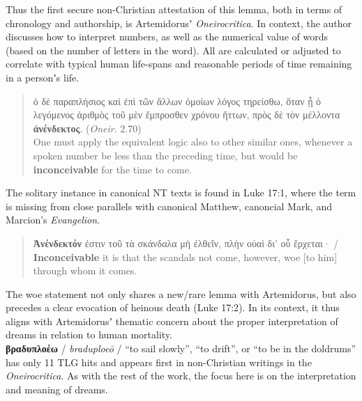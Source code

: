  Thus the first secure non-Christian attestation of this lemma, %
 both in terms of chronology and authorship, %
 is Artemidorusʼ \textit{Oneirocritica}. %
 In context, the author discusses how to interpret numbers, %
 as well as the numerical value of words (based on the number of letters in the word). %
 All are calculated or adjusted to correlate with typical human life-spans and %
 reasonable periods of time remaining in a personʼs life. %

\vspace*{2mm} 
 \begin{quote}ὁ δὲ παραπλήσιος καὶ ἐπὶ τῶν ἄλλων ὁμοίων λόγος τηρείσθω,
 ὅταν ᾖ ὁ λεγόμενος ἀριθμὸς τοῦ μὲν ἔμπροσθεν χρόνου ἥττων, %
 πρὸς δὲ τὸν μέλλοντα \textbf{ἀνένδεκτος}. (\textit{Oneir}. 2.70) \\[1mm]
 One must apply the equivalent logic also to other similar ones, %
 whenever a spoken number be less than the preceding time, %
 but would be \textbf{inconceivable} for the time to come. \end{quote} %
 \vspace*{2mm}
The solitary instance in canonical NT texts is found in Luke 17:1, %
where the term is missing from close parallels with canonical Matthew, %
canoncial Mark, and Marcion's \textit{Evangelion}. %

\vspace*{2mm} 
 \begin{quote}\textbf{Ἀνένδεκτόν} ἐστιν τοῦ τὰ σκάνδαλα μὴ ἐλθεῖν, %
  πλὴν οὐαὶ δι’ οὗ ἔρχεται· / \textbf{Inconceivable} it is that the scandals not come, %
 however, woe [to him] through whom it comes. %
\end{quote} %
 \vspace*{2mm}

The woe statement not only shares a new/rare lemma with Artemidorus, %
but also precedes a clear evocation of heinous death (Luke 17:2). %
In its context, it thus aligns with Artemidorusʼ thematic concern about the proper interpretation of dreams %
in relation to human mortality. \\[1.5mm] %

\noindent{}\textbf{βραδυπλοέω} / \textit{braduploeō} / “to sail slowly”, %
“to drift”, or “to be in the doldrums” has only 11 TLG hits and appears first in non-Christian writings %
in the \textit{Oneirocritica}. %
As with the rest of the work, %
the focus here is on the interpretation and meaning of dreams. %

